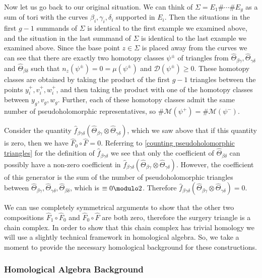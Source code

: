 Now let us go back to our original situation. We can think of $\Sigma=E_1 \# \cdots \# E_g$ as a sum of tori with the curves $\beta_i,\gamma_i,\delta_i$ supported in $E_i$. Then the situations in the first $g-1$ summands of $\Sigma$ is identical to the first example we examined above, and the situation in the last summand of $\Sigma$ is identical to the last example we examined above. Since the base point $z \in \Sigma$ is placed away from the curves we can see that there are exactly two homotopy classes $\psi^\pm$ of triangles from $\widehat{\Theta}_{\beta\gamma},\widehat{\Theta}_{\gamma\delta}$ and $\widehat{\Theta}_{\beta\delta}$ such that $n_z(\psi^\pm)=0=\mu(\psi^\pm)$ and $\mathcal D(\psi^\pm) \geq 0$. These homotopy classes are obtained by taking the product of the first $g-1$ triangles between the points $y_i^+,v_i^+,w_i^+$, and then taking the product with one of the homotopy classes between $y_g,v_g,w_g$. Further, each of these homotopy classes admit the same number of pseudoholomorphic representatives, so $\# \mathcal M(\psi^+)=\# \mathcal M(\psi^-)$.

Consider the quantity $\widehat{f}_{\beta\gamma\delta}(\widehat{\Theta}_{\beta\gamma} \otimes \widehat{\Theta}_{\gamma\delta})$, which we saw above that if this quantity is zero, then we have $\widehat{F}_0 \circ \widehat{F} = 0$. Referring to \eqref{counting pseudoholomorphic triangles} for the definition of $\widehat{f}_{\beta\gamma\delta}$ we see that only the coefficient of $\widehat{\Theta}_{\beta\delta}$ can possibly have a non-zero coefficient in $\widehat{f}_{\beta\gamma\delta}(\widehat{\Theta}_{\beta\gamma} \otimes \widehat{\Theta}_{\gamma\delta})$. However, the coefficient of this generator is the sum of the number of pseudoholomorphic triangles between $\widehat{\Theta}_{\beta\gamma},\widehat{\Theta}_{\gamma\delta},\widehat{\Theta}_{\beta\delta}$, which is $\equiv 0 \modulo 2$. Therefore $\widehat{f}_{\beta\gamma\delta}(\widehat{\Theta}_{\beta\gamma} \otimes \widehat{\Theta}_{\gamma\delta}) = 0$.

We can use completely symmetrical arguments to show that the other two compositions $\widehat{F}_1 \circ \widehat{F}_0$ and $\widehat{F}_0 \circ \widehat{F}$ are both zero, therefore the surgery triangle is a chain complex. In order to show that this chain complex has trivial homology we will use a slightly technical framework in homological algebra. So, we take a moment to provide the necessary homological background for these constructions.

\subsubsection*{Homological Algebra Background}


